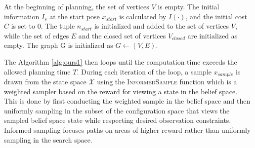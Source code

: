 At the beginning of planning, the set of vertices $V$ is empty. The initial information $I_s$ at the start pose $x_{start}$ is calculated by $I(\cdot)$, and the initial cost $C$ is set to 0. The tuple $n_{start}$ is initialized and added to the set of vertices $V$, while the set of edges $E$ and the closed set of vertices $V_{closed}$ are initialized as empty. The graph G is initialized as $G \leftarrow (V, E)$. 









The Algorithm \ref{alg:ours1} then loops until the computation time exceeds the allowed planning time $T$. During each iteration of the loop, a sample $x_{sample}$ is drawn from the state space $\mathcal{X}$ using the \textsc{InformedSample} function which is a weighted sampler based on the reward for viewing a state in the belief space. This is done by first conducting the weighted sample in the belief space and then uniformly sampling in the subset of the configuration space that views the sampled belief space state while respecting desired observation constraints. Informed sampling focuses paths on areas of higher reward rather than uniformly sampling in the search space.


